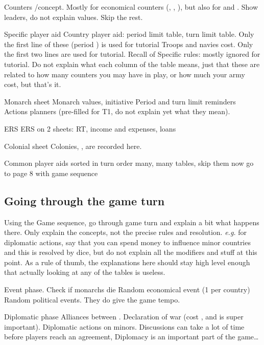 \aparag Counters
\bparag \Faceplus/\facemoins concept. Mostly for economical counters (\COL,
\TP, \TradeFLEET), but also for \ARMY and \FLEET.
\bparag Show leaders, do not explain values.
\bparag Skip the rest.

\aparag Specific player aid
\bparag Country player aid: period limit table, turn limit table. Only the
first line of these (period ) is used for tutorial
\bparag Troops and navies cost. Only the first two lines are used for tutorial.
\bparag Recall of Specific rules: mostly ignored for tutorial.
\bparag Do not explain what each column of the table means, just that these
are related to how many counters you may have in play, or how much your army
cost, but that's it.

\aparag Monarch sheet
\bparag Monarch values, initiative
\bparag Period and turn limit reminders
\bparag Actions planners (pre-filled for T1, do not explain yet what they
mean).

\aparag ERS
 ERS on 2 sheets: RT, income and expenses, loans

\aparag Colonial sheet
\bparag Colonies, \TP, \TradeFLEET are recorded here.

\aparag Common player aids
\bparag sorted in turn order
\bparag many, many tables, skip them now
\bparag go to page 8 with game sequence

\subsection{Going through the game turn}
\aparag Using the Game sequence, go through game turn and explain a bit what
happens there.
\bparag Only explain the concepts, not the precise rules and resolution.
\bparag \emph{e.g.} for diplomatic actions, say that you can spend money to
influence minor countries and this is resolved by dice, but do not explain all
the modifiers and stuff at this point. As a rule of thumb, the explanations
here should stay high level enough that actually looking at any of the tables
is useless.

\aparag Event phase.
\bparag Check if monarchs die
\bparag Random economical event (1 per country)
\bparag Random political events. They do give the game tempo.

\aparag Diplomatic phase
\bparag Alliances between \MAJ.
\bparag Declaration of war (cost \STAB, and \STAB is super important).
\bparag Diplomatic actions on minors.
\bparag Discussions can take a lot of time before players reach an agreement,
Diplomacy is an important part of the game\ldots

